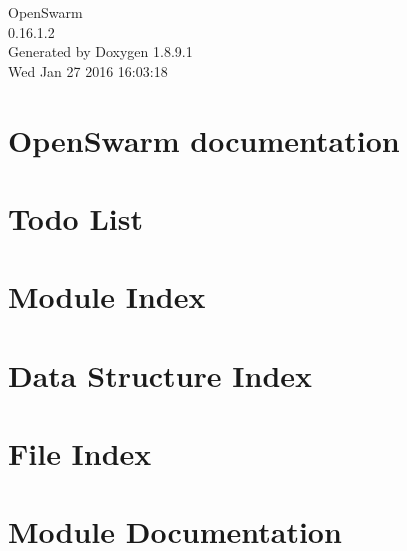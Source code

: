 \documentclass[twoside]{article}
\newcommand{\+}{\discretionary{\mbox{\scriptsize$\hookleftarrow$}}{}{}}
\begin{document}
\hypersetup{pageanchor=false,
             bookmarks=true,
             bookmarksnumbered=true,
             pdfencoding=unicode
            }
\begin{titlepage}
\vspace*{7cm}
\begin{center}%
{\Large Open\+Swarm \\[1ex]\large 0.\+16.\+1.\+2 }\\
\vspace*{1cm}
{\large Generated by Doxygen 1.8.9.1}\\
\vspace*{0.5cm}
{\small Wed Jan 27 2016 16:03:18}\\
\end{center}
\end{titlepage}
\tableofcontents
{}
\hypersetup{pageanchor=true}

\section{Open\+Swarm documentation}
\label{index}\hypertarget{index}{}
\section{Todo List}
\label{dd/da0/todo}
\hypertarget{dd/da0/todo}{}

\section{Module Index}

\section{Data Structure Index}

\section{File Index}

\section{Module Documentation}











\end{document}
